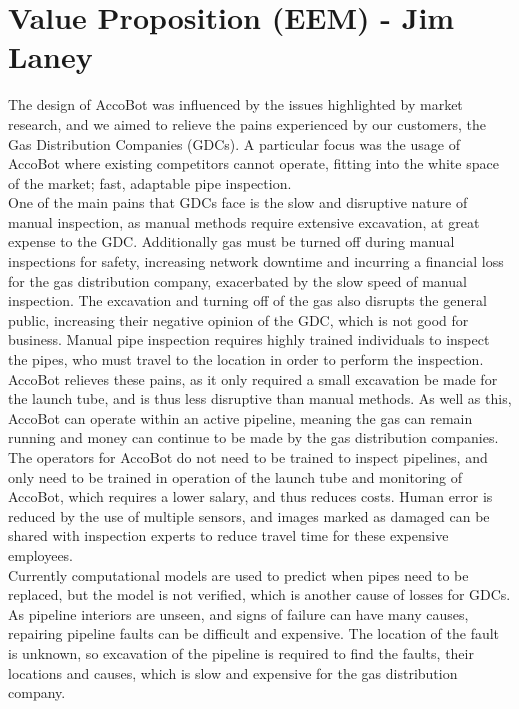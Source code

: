 \documentclass[11pt]{article}		%
\begin{document}
	\section[Value Proposition - EEM]{Value Proposition (EEM) - Jim Laney} \label{solutionEvaluation}
	
		The design of AccoBot was influenced by the issues highlighted by market research, and we aimed to relieve the pains experienced by our customers, the Gas Distribution Companies (GDCs).
		A particular focus was the usage of AccoBot where existing competitors cannot operate, fitting into the white space of the market; fast, adaptable pipe inspection.
		\\
        \hspace*{3ex}One of the main pains that GDCs face is the slow and disruptive nature of manual inspection, as manual methods require extensive excavation, at great expense to the GDC.
		Additionally gas must be turned off during manual inspections for safety, increasing network downtime and incurring a financial loss for the gas distribution company, exacerbated by the slow speed of manual inspection.
		The excavation and turning off of the gas also disrupts the general public, increasing their negative opinion of the GDC, which is not good for business.
		Manual pipe inspection requires highly trained individuals to inspect the pipes, who must travel to the location in order to perform the inspection.
		AccoBot relieves these pains, as it only required a small excavation be made for the launch tube, and is thus less disruptive than manual methods.
		As well as this, AccoBot can operate within an active pipeline, meaning the gas can remain running and money can continue to be made by the gas distribution companies.
		The operators for AccoBot do not need to be trained to inspect pipelines, and only need to be trained in operation of the launch tube and monitoring of AccoBot, which requires a lower salary, and thus reduces costs.
		Human error is reduced by the use of multiple sensors, and images marked as damaged can be shared with inspection experts to reduce travel time for these expensive employees.
		\\
        \hspace*{3ex}Currently computational models are used to predict when pipes need to be replaced, but the model is not verified, which is another cause of losses for GDCs.
		As pipeline interiors are unseen, and signs of failure can have many causes, repairing pipeline faults can be difficult and expensive.
		The location of the fault is unknown, so excavation of the pipeline is required to find the faults, their locations and causes, which is slow and expensive for the gas distribution company.
\end{document}
